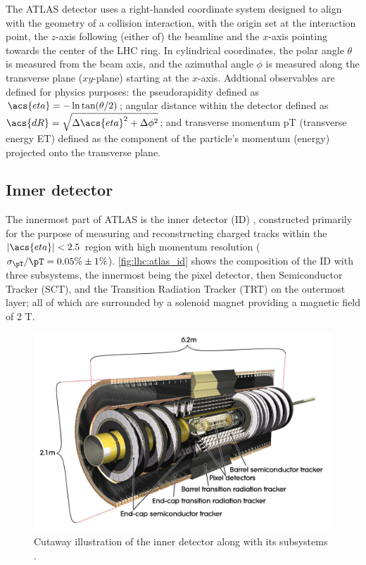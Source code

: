 \documentclass[../thesis.tex]{subfiles}
\begin{document}
The \acs{ATLAS} detector uses a right-handed coordinate system \citep{atlas} designed to align with the geometry of a collision interaction, with the origin set at the interaction point, the $z$-axis following (either of) the beamline and the $x$-axis pointing towards the center of the \acs{LHC} ring. In cylindrical coordinates, the polar angle $\theta$ is measured from the beam axis, and the azimuthal angle $\phi$ is measured along the transverse plane ($xy$-plane) starting at the $x$-axis. Addtional observables are defined for physics purposes: the pseudorapidity defined as $\acs{eta} = -\ln \tan (\theta/2)$; angular distance within the detector defined as $\acs{dR} = \sqrt{\Delta \acs{eta}^2 + \Delta\phi^2}$; and transverse momentum \acs{pT} (transverse energy \acs{ET}) defined as the component of the particle's momentum (energy) projected onto the transverse plane. 

\subsection{Inner detector}
The innermost part of \acs{ATLAS} is the inner detector (\acs{ID}) \citep{atlas}, constructed primarily for the purpose of measuring and reconstructing charged tracks within the $|\acs{eta}|<2.5$ region with high momentum resolution ($\sigma_{\pT} / \pT = 0.05\% \pm 1\%$). \autoref{fig:lhc:atlas_id} shows the composition of the \acs{ID} with three subsystems, the innermost being the pixel detector, then Semiconductor Tracker (\acs{SCT}), and the Transition Radiation Tracker (\acs{TRT}) on the outermost layer; all of which are surrounded by a solenoid magnet providing a magnetic field of 2 T.

\begin{figure}[!htb]
\begin{center}
\includegraphics[width=0.7\linewidth]{fig/lhc_atlas_id.jpg}
\caption[Cutaway illustration of the inner detector along with its subsystems.]{\label{fig:lhc:atlas_id}Cutaway illustration of the inner detector along with its subsystems \citep{lhc:atlas_id}.}
\end{center}
\end{figure}
\end{document}
